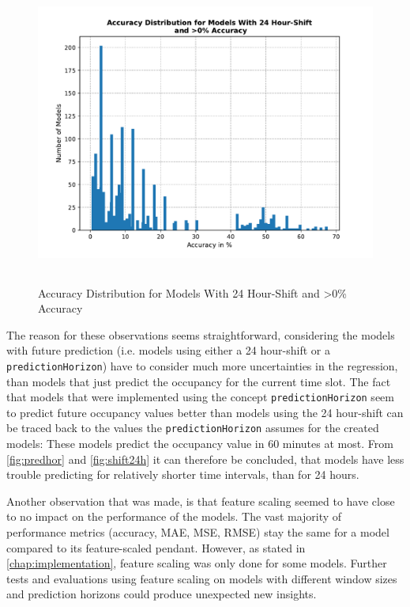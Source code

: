   \begin{figure}[htbp]
    \centering
    \includegraphics[height=10cm]{plots/shift24h.pdf}
    \caption{Accuracy Distribution for Models With 24 Hour-Shift
    and >0\% Accuracy}
    \label{fig:shift24h}
  \end{figure}


  The reason for these observations seems straightforward, considering the models with future prediction (i.e. models using either a 24 hour-shift or a \texttt{predictionHorizon}) have to consider much more uncertainties in the regression, than models that just predict the occupancy for the current time slot. The fact that models that were implemented using the concept \texttt{predictionHorizon} seem to predict future occupancy values better than models using the 24 hour-shift can be traced back to the values the \texttt{predictionHorizon} assumes for the created models: These models predict the occupancy value in 60 minutes at most. From \autoref{fig:predhor} and \autoref{fig:shift24h} it can therefore be concluded, that models have less trouble predicting for relatively shorter time intervals, than for 24 hours.
  
  Another observation that was made, is that feature scaling seemed to have close to no impact on the performance of the models. The vast majority of performance metrics (accuracy, MAE, MSE, RMSE) stay the same for a model compared to its feature-scaled pendant. However, as stated in \autoref{chap:implementation}, feature scaling was only done for some models. Further tests and evaluations using feature scaling on models with different window sizes and prediction horizons could produce unexpected new insights.
  
